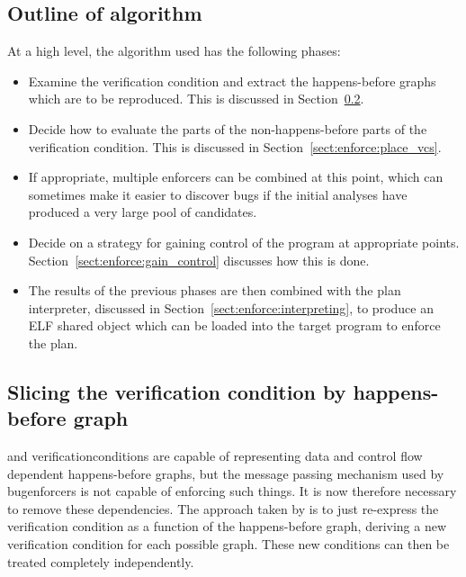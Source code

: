 \subsection{Outline of algorithm}

At a high level, the algorithm used has the following phases:

\begin{itemize}
\item
  Examine the verification condition and extract the happens-before
  graphs which are to be reproduced.  This is discussed in
  Section~\ref{sect:enforce:slice_hb_graph}.
\item
  Decide how to evaluate the parts of the non-happens-before parts of
  the verification condition.  This is discussed in
  Section~\ref{sect:enforce:place_vcs}.
\item
  If appropriate, multiple enforcers can be combined at this point,
  which can sometimes make it easier to discover bugs if the initial
  analyses have produced a very large pool of
  candidates.
\item
  Decide on a strategy for gaining control of the program at
  appropriate points.  Section~\ref{sect:enforce:gain_control}
  discusses how this is done.

\item
  The results of the previous phases are then combined with the plan
  interpreter, discussed in Section~\ref{sect:enforce:interpreting},
  to produce an ELF shared object which can be loaded into the target
  program to enforce the plan.
\end{itemize}

\subsection{Slicing the verification condition by happens-before graph}
\label{sect:enforce:slice_hb_graph}


{\STateMachines} and \glspl{verificationcondition} are capable of
representing data and control flow dependent happens-before graphs,
but the message passing mechanism used by \glspl{bugenforcer} is not
capable of enforcing such things.  It is now therefore necessary to
remove these dependencies.  The approach taken by {\implementation} is
to just re-express the verification condition as a function of the
happens-before graph, deriving a new verification condition for each
possible graph.  These new conditions can then be treated completely
independently.


